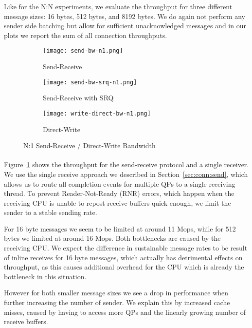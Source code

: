 Like for the N:N experiments, we evaluate the throughput for three different message sizes: 16 bytes, 
512 bytes, and 8192 bytes. We do again not perform any sender side batching but allow for sufficient unacknowledged messages 
and in our plots we report the sum of all connection throughputs.


\begin{figure}[ht]
  \centering
\begin{subfigure}[b]{0.49\textwidth}
  \centering
  \texttt{[image: send-bw-n1.png]}
  \caption{Send-Receive}
  \label{fig:plot-sndrcv-bw-n1-nosrq}
\end{subfigure}
\begin{subfigure}[b]{0.49\textwidth}
  \centering
  \texttt{[image: send-bw-srq-n1.png]}
  \caption{Send-Receive with SRQ}
  \label{fig:plot-sndrcv-bw-n1-srq}
\end{subfigure}
  \begin{subfigure}[b]{0.48\textwidth}
  \centering
  \texttt{[image: write-direct-bw-n1.png]}
  \caption{Direct-Write}
  \label{fig:plot-wdir-bw-n1}
  \end{subfigure}
\caption{N:1 Send-Receive / Direct-Write Bandwidth}
  \label{fig:plot-sndrcv-bw-n1}
\end{figure}



\paragraph{} Figure~\ref{fig:plot-sndrcv-bw-n1-nosrq} shows the throughput for the send-receive protocol and a single receiver. We
use the single receive approach we described in Section~\ref{sec:conn:send}, which allows us to route all completion events for 
multiple QPs to a single receiving thread. To prevent Reader-Not-Ready (RNR) errors, which happen when the receiving CPU is 
unable to repost receive buffers quick enough, we limit the sender to a stable sending rate.

For 16 byte messages we seem to be limited at around 11 Mops, while for 512 bytes we limited at around 16 Mops. Both bottlenecks
are caused by the receiving CPU. We expect the difference in sustainable message rates to be result of inline receives for 
16 byte messages, which actually has detrimental effects on throughput, as this causes additional overhead for the CPU which 
is already the bottleneck in this situation.

However for both smaller message sizes we see a drop in performance when further increasing the number of sender. We explain 
this by increased cache misses, caused by having to access more QPs and the linearly growing number of receive buffers.

